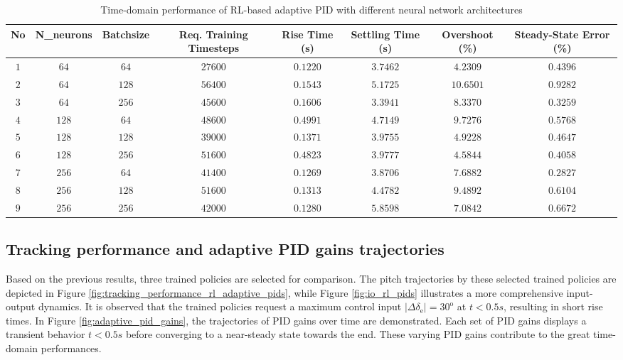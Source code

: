 \documentclass[lettersize,journal]{IEEEtran}
\begin{document}
\begin{table}[!t]
\caption{Time-domain performance of RL-based adaptive PID with different neural network architectures}
\label{tab:different_rl_performance}
\centering
\begin{tabular}{|c||c||c||c||c||c||c|c|}
\hline
No & N\_neurons & Batchsize & Req. Training Timesteps & Rise Time (s) & Settling Time (s) & Overshoot (\%) & Steady-State Error (\%) \\
\hline
$1$ & $64$ & $64$ & $27600$ & $0.1220$ & $3.7462$ & $4.2309$ & $0.4396$ \\
\hline
$2$ & $64$ & $128$ & $56400$ & $0.1543$ & $5.1725$ & $10.6501$ & $0.9282$ \\
\hline
$3$ & $64$ & $256$ & $45600$ & $0.1606$ & $3.3941$ & $8.3370$ & $0.3259$ \\
\hline
$4$ & $128$ & $64$ & $48600$ & $0.4991$ & $4.7149$ & $9.7276$ & $0.5768$ \\
\hline
$5$ & $128$ & $128$ & $39000$ & $0.1371$ & $3.9755$ & $4.9228$ & $0.4647$ \\
\hline
$6$ & $128$ & $256$ & $51600$ & $0.4823$ & $3.9777$ & $4.5844$ & $0.4058$ \\
\hline
$7$ & $256$ & $64$ & $41400$ & $0.1269$ & $3.8706$ & $7.6882$ & $0.2827$ \\
\hline
$8$ & $256$ & $128$ & $51600$ & $0.1313$ & $4.4782$ & $9.4892$ & $0.6104$ \\
\hline
$9$ & $256$ & $256$ & $42000$ & $0.1280$ & $5.8598$ & $7.0842$ & $0.6672$ \\
\hline
\end{tabular}
\end{table}

\subsection{Tracking performance and adaptive PID gains trajectories}
Based on the previous results, three trained policies are selected for comparison. The pitch trajectories by these selected trained policies are depicted in Figure \ref{fig:tracking_performance_rl_adaptive_pids}, while Figure \ref{fig:io_rl_pids} illustrates a more comprehensive input-output dynamics. It is observed that the trained policies request a maximum control input $|\Delta\delta_{\mathrm{e}}|=30^\mathrm{o}$ at $t<0.5s$, resulting in short rise times. In Figure \ref{fig:adaptive_pid_gains}, the trajectories of PID gains over time are demonstrated. Each set of PID gains displays a transient behavior $t<0.5s$ before converging to a near-steady state towards the end. These varying PID gains contribute to the great time-domain performances.
\end{document}
